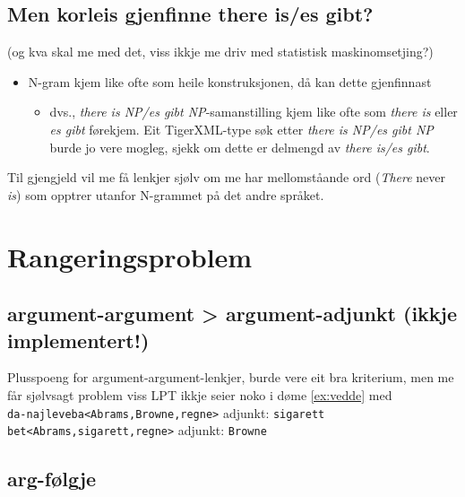 \documentclass[11pt,a4paper,oneside,draft]{book}
\begin{document}

  

\subsection{Men korleis gjenfinne there is/es gibt?}
\label{sec-5.2.1}

(og kva skal me med det, viss ikkje me driv med statistisk
maskinomsetjing?)

\begin{itemize}
\item N-gram kjem like ofte som heile konstruksjonen, då kan dette
  gjenfinnast

\begin{itemize}
\item dvs., \emph{there is NP/es gibt NP}-samanstilling kjem like ofte som
    \emph{there is} eller \emph{es gibt} førekjem. Eit TigerXML-type søk etter
    \emph{there is NP/es gibt NP} burde jo vere mogleg, sjekk om dette er
    delmengd av \emph{there is/es gibt}.
\end{itemize}

\end{itemize}
Til gjengjeld vil me få lenkjer sjølv om me har mellomståande ord
(\emph{There} never \emph{is}) som opptrer utanfor N-grammet på det andre
språket.



\section{Rangeringsproblem}
\label{sec-5.3}

\subsection{argument-argument > argument-adjunkt (ikkje implementert!)}
\label{sec-5.3.1}

    Plusspoeng for argument-argument-lenkjer, burde vere eit bra
    kriterium, men me får sjølvsagt problem viss LPT ikkje seier noko
    i døme \ref{ex:vedde} med \\
    \texttt{da-najleveba<Abrams,Browne,regne>} adjunkt: \texttt{sigarett}\\
    \texttt{bet<Abrams,sigarett,regne>} adjunkt: \texttt{Browne}
    
\subsection{arg-følgje}
\label{sec-5.3.2}
\end{document}
